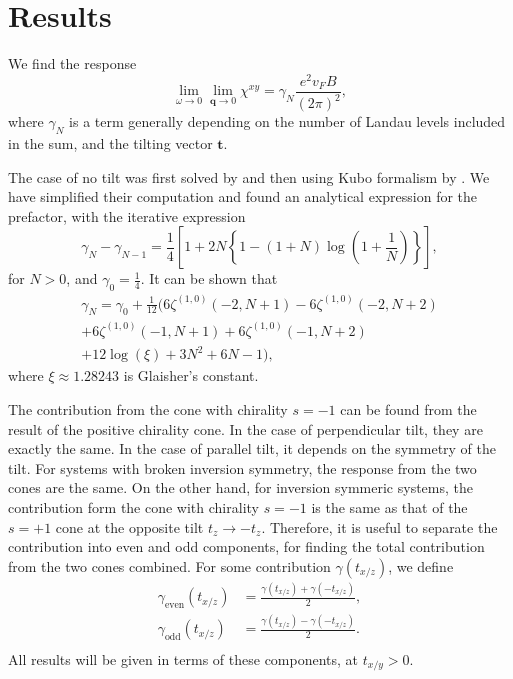 \documentclass[%
 reprint,
 amsmath,amssymb,
 aps,
]{revtex4-2}
\renewcommand\vec\bm  %
\begin{document}
\section{Results\label{sec:results}}
We find the response
\begin{equation}
  \label{eq:response-w-dimensions}
  \lim_{\omega \to 0} \lim_{\vec{q} \to 0}
  \chi^{xy} =
  \gamma_{N} \frac{e^2 v_F B}{(2\pi)^2},
\end{equation}
where \( \gamma_N \) is a term generally depending on the number of Landau levels included in the sum, and the tilting vector \( \vec{t} \).

The case of no tilt was first solved by \textcite{chernodubGenerationNernstCurrent2018} and then using Kubo formalism by \textcite{arjonaFingerprintsConformalAnomaly2019}.
We have simplified their computation and found an analytical expression for the prefactor, with the iterative expression
\begin{equation}
  \label{eq:2}
  \gamma_{N} - \gamma_{N-1} = \frac{1}{4} \left[ 1 + 2 N \left\{ 1 - (1+N) \log \left(1 + \frac{1}{N}\right) \right\} \right],
\end{equation}
for \( N>0 \), and \( \gamma_0 = \frac{1}{4} \).
It can be shown that
\begin{multline}
  \label{eq:4}
  \gamma_N = \gamma_0 + \frac{1}{12} \Big(
    6 \zeta ^{(1,0)}(-2,N+1)
    -6 \zeta ^{(1,0)}(-2,N+2)\\
    +6 \zeta^{(1,0)}(-1,N+1)
    + 6 \zeta^{(1,0)}(-1,N+2)\\
    +12 \log (\xi)
    +3 N^2
    +6 N
    -1
  \Big),
\end{multline}
where \( \xi \approx  1.28243 \) is Glaisher's constant.


The contribution from the cone with chirality \( s = -1 \) can be found from the result of the positive chirality cone.
In the case of perpendicular tilt, they are exactly the same.
In the case of parallel tilt, it depends on the symmetry of the tilt.
For systems with broken inversion symmetry, the response from the two cones are the same.
On the other hand, for inversion symmeric systems, the contribution form the cone with chirality \( s=-1 \) is the same as that of the \( s=+1 \) cone at the opposite tilt \( t_z \to - t_z \).
Therefore, it is useful to separate the contribution into even and odd components, for finding the total contribution from the two cones combined.
For some contribution \( \gamma(t_{x /z}) \), we define
\begin{align}
  \gamma_{\text{even}}(t_{x/z}) &= \frac{\gamma(t_{x/z}) + \gamma(-t_{x/z})}{2}\label{eq:132},\\
  \gamma_{\text{odd}}(t_{x/z}) &= \frac{\gamma(t_{x/z}) - \gamma(-t_{x/z})}{2}\label{eq:133}.\\
\end{align}
All results will be given in terms of these components, at \( t_{x /y} > 0 \).
\end{document}

